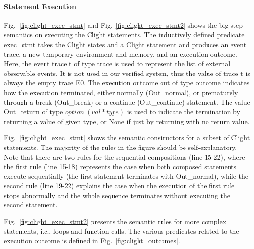 \paragraph{Statement Execution}
Fig.~\ref{fig:clight_exec_stmt} and Fig.~\ref{fig:clight_exec_stmt2}
shows the big-step semantics on executing the Clight statements.
The inductively defined predicate \textsf{exec\_stmt} takes
the Clight states and a Clight statement and produces
an event trace, a new temporary environment and memory, and
an execution outcome. Here, the event trace \textsf{t} of type
\textsf{trace} is used to represent the list
of external observable events. It is not used in our verified system, thus
the value of trace \textsf{t} is always the empty trace \textsf{E0}.
The execution outcome \textsf{out} of type \textsf{outcome} indicates how
the execution terminated, either normally (\textsf{Out\_normal}), or prematurely
through a break (\textsf{Out\_break}) or a continue (\textsf{Out\_continue})
statement. The value \textsf{Out\_return} of type $option~(val * type)$ is used to indicate
the termination by returning a value of given type, or \textsf{None} if
just by returning with no return value.

Fig.~\ref{fig:clight_exec_stmt} shows the semantic constructors for a subset
of Clight statements. The majority of the rules in the figure should be
self-explanatory. Note that there are two rules for the sequential compositions
(line 15-22), where the first rule (line 15-18) represents the case when
both composed statements execute sequentially (the first statement terminates
with \textsf{Out\_normal}), while the second rule (line 19-22) explains
the case when the execution of the first rule stops abnormally and the whole sequence
terminates without executing the second statement.

Fig.~\ref{fig:clight_exec_stmt2} presents the semantic rules for more
complex statements, i.e., loops and function calls.
The various predicates related to the execution outcome is defined in
Fig.~\ref{fig:clight_outcomes}.

